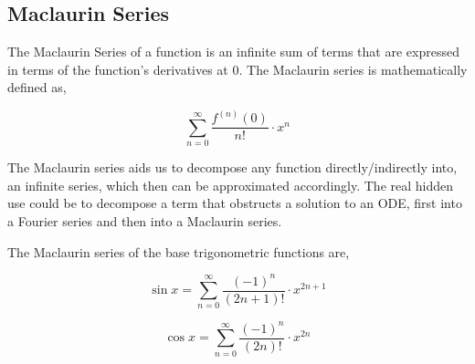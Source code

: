 

\subsection{{Maclaurin Series}}

	{The Maclaurin Series of a function is an infinite sum of terms that are expressed in terms of the function's derivatives at 0. The Maclaurin series is mathematically defined as,}

		$$\sum_{n=0}^{\infty}\frac{f^{(n)}(0)}{n!}\cdot x^n$$

	{The Maclaurin series aids us to decompose any function directly/indirectly into, an infinite series, which then can be approximated accordingly. The real hidden use could be to decompose a term that obstructs a solution to an ODE, first into a Fourier series and then into a Maclaurin series.}

	{The Maclaurin series of the base trigonometric functions are,}

		$$\sin x = \sum_{n=0}^{\infty}\frac{(-1)^n}{(2n+1)!}\cdot x^{2n+1}$$
		
		$$\cos x = \sum_{n=0}^{\infty}\frac{(-1)^n}{(2n)!}\cdot x^{2n}$$		
		


